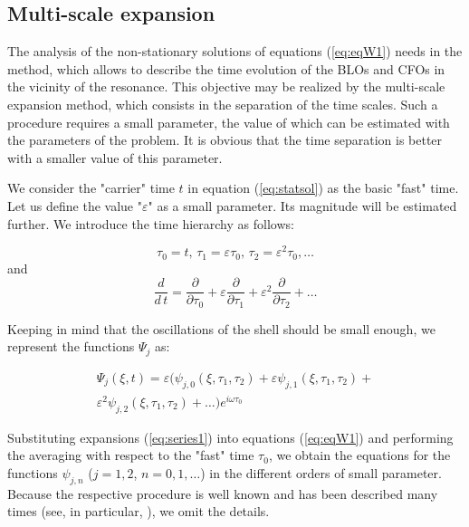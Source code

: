 \subsection{Multi-scale expansion}

The analysis of the non-stationary solutions of equations (\ref{eq:eqW1}) needs in the method, which allows to describe the time evolution of the BLOs and CFOs in the vicinity of the resonance.
This objective may be realized by the multi-scale expansion method, which consists in the separation of the time scales.
Such a procedure requires a small parameter, the value of which can be estimated with the parameters of the problem.
It is obvious that the time separation is better with a smaller value of this parameter.

We consider the "carrier" time $t$ in equation (\ref{eq:statsol}) as the basic "fast" time.
Let us define the value "$\varepsilon$" as a small parameter.
Its magnitude will be estimated further.
We introduce the time hierarchy as follows:

\begin{equation}
\tau_{0}=t, \, \tau_{1}=\varepsilon \tau_{0}, \, \tau_{2}=\varepsilon^2 \tau_{0}, \dots
\end{equation}
and
\begin{equation}
\frac{d}{d\,t}=\frac{\partial }{\partial \tau_{0}}+\varepsilon \frac{\partial }{\partial \tau_{1}}+\varepsilon^2 \frac{\partial }{\partial \tau_{2}} + \dots
\end{equation}

Keeping in mind that the oscillations of the shell should be small enough, we represent the functions $\Psi_{j}$ as:

\begin{eqnarray}\label{eq:series1}
\Psi_{j}(\xi, t)=\varepsilon \bigl( \psi_{j,0}(\xi, \tau_{1},\tau_{2})+\varepsilon \psi_{j,1}(\xi, \tau_{1},\tau_{2})+  \nonumber  \\
\varepsilon^2 \psi_{j,2}(\xi, \tau_{1},\tau_{2})+ \dots \bigr) e^{i \omega \tau_{0}}
\end{eqnarray}

Substituting expansions (\ref{eq:series1}) into equations (\ref{eq:eqW1}) and performing the averaging with respect to the "fast" time $\tau_{0}$, we obtain the equations for the functions $\psi_{j,n}$ ($j=1,2$, $n=0,1,\dots$) in the different orders of small parameter.
Because the respective procedure is  well known and has been described many times  (see, in particular, \cite{Smirnov2016PhysD,VVS2010}), we omit the details. 

